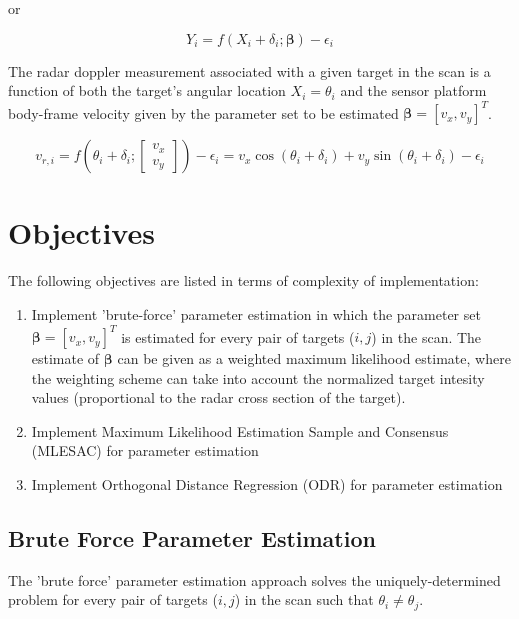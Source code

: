\documentclass[]{article}
\begin{document}
or 

\begin{equation}
	Y_i = f(X_i + \delta_i;\boldsymbol{\beta}) - \epsilon_i
\end{equation}


The radar doppler measurement associated with a given target in the scan is a function of both the target's angular location $X_i = \theta_i$ and the sensor platform body-frame velocity given by the parameter set to be estimated $\boldsymbol{\beta} = [v_x, v_y]^T$.

\begin{equation}
	v_{r,i} = f(\theta_i + \delta_i;\begin{bmatrix} v_x \\ v_y \end{bmatrix}) - \epsilon_i = v_x \cos(\theta_i + \delta_i) + v_y \sin(\theta_i + \delta_i) - \epsilon_i
\end{equation}



\section{Objectives}

The following objectives are listed in terms of complexity of implementation:

\begin{enumerate}
	\item Implement 'brute-force' parameter estimation in which the parameter set $\boldsymbol{\beta} = [v_x,v_y]^T$ is estimated for every pair of targets ($i,j$) in the scan. The estimate of $\boldsymbol{\beta}$ can be given as a weighted maximum likelihood estimate, where the weighting scheme can take into account the normalized target intesity values (proportional to the radar cross section of the target).
	\item Implement Maximum Likelihood Estimation Sample and Consensus (MLESAC) for parameter estimation
	\item Implement Orthogonal Distance Regression (ODR) for parameter estimation
\end{enumerate}

\subsection{Brute Force Parameter Estimation}

The 'brute force' parameter estimation approach solves the uniquely-determined problem for every pair of targets ($i,j$) in the scan such that $\theta_i \neq \theta_j$.
\end{document}
